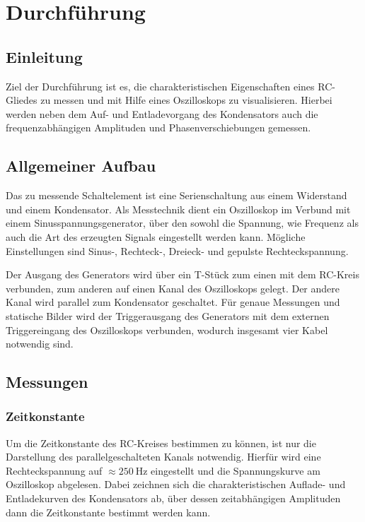 \section{Durchführung}
\label{sec:Durchführung}

\subsection{Einleitung}
Ziel der Durchführung ist es, die charakteristischen Eigenschaften eines RC-Gliedes zu messen und mit Hilfe eines Oszilloskops
zu visualisieren. Hierbei werden neben dem Auf- und Entladevorgang des Kondensators auch die frequenzabhängigen Amplituden und
Phasenverschiebungen gemessen.

\subsection{Allgemeiner Aufbau}
Das zu messende Schaltelement ist eine Serienschaltung aus einem Widerstand und einem Kondensator.
Als Messtechnik dient ein Oszilloskop im Verbund mit einem Sinusspannungsgenerator, über den sowohl die Spannung, wie Frequenz 
als auch die Art des erzeugten Signals eingestellt werden kann. Mögliche Einstellungen sind Sinus-, Rechteck-, Dreieck- und gepulste Rechteckspannung.

Der Ausgang des Generators wird über ein T-Stück zum einen mit dem RC-Kreis verbunden, zum anderen auf einen Kanal des Oszilloskops gelegt.
Der andere Kanal wird parallel zum Kondensator geschaltet. Für genaue Messungen und statische Bilder wird der Triggerausgang des Generators 
mit dem externen Triggereingang des Oszilloskops verbunden, wodurch insgesamt vier Kabel notwendig sind.

\subsection{Messungen}
\subsubsection{Zeitkonstante}
Um die Zeitkonstante des RC-Kreises bestimmen zu können, ist nur die Darstellung des parallelgeschalteten Kanals notwendig.
Hierfür wird eine Rechteckspannung auf $\approx \SI{250}{\hertz}$ eingestellt und die Spannungskurve am Oszilloskop abgelesen.
Dabei zeichnen sich die charakteristischen Auflade- und Entladekurven des Kondensators ab, über dessen zeitabhängigen Amplituden dann die Zeitkonstante bestimmt werden kann.

